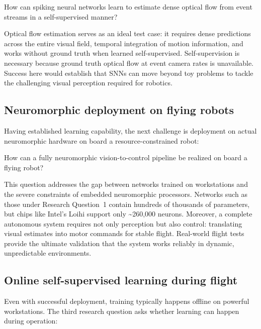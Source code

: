 \begin{tcolorbox}[title={\textbf{Research Question 1}}]
    How can spiking neural networks learn to estimate dense optical flow from event streams in a self-supervised manner?
\end{tcolorbox}

Optical flow estimation serves as an ideal test case: it requires dense predictions across the entire visual field, temporal integration of motion information, and works without ground truth when learned self-supervised. Self-supervision is necessary because ground truth optical flow at event camera rates is unavailable. Success here would establish that SNNs can move beyond toy problems to tackle the challenging visual perception required for robotics.

\subsection*{Neuromorphic deployment on flying robots}

Having established learning capability, the next challenge is deployment on actual neuromorphic hardware on board a resource-constrained robot:

\begin{tcolorbox}[title={\textbf{Research Question 2}}]
    How can a fully neuromorphic vision-to-control pipeline be realized on board a flying robot?
\end{tcolorbox}

This question addresses the gap between networks trained on workstations and the severe constraints of embedded neuromorphic processors. Networks such as those under Research Question~1 contain hundreds of thousands of parameters, but chips like Intel's Loihi support only \textasciitilde{}260,000 neurons. Moreover, a complete autonomous system requires not only perception but also control: translating visual estimates into motor commands for stable flight. Real-world flight tests provide the ultimate validation that the system works reliably in dynamic, unpredictable environments.

\subsection*{Online self-supervised learning during flight}

Even with successful deployment, training typically happens offline on powerful workstations. The third research question asks whether learning can happen during operation:

